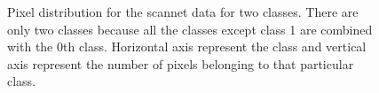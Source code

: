     \begin{figure}%
    	\centering
    	\qquad
    	\caption{Pixel distribution for the scannet data for two classes. There are only two classes because all the classes except class 1 are combined with the 0th class. Horizontal axis represent the class and vertical axis represent the number of pixels belonging to that particular class.}%
    	\label{fig:scannet_two_classes}%
    \end{figure}

